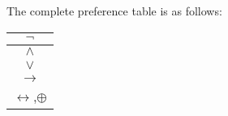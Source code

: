 \documentclass[letterpaper,12pt,fleqn]{article}
\renewcommand{\implies}{\rightarrow}
\renewcommand{\iff}{\leftrightarrow}
\newcommand{\lxor}{\oplus}
\begin{document}
The complete preference table is as follows:

\begin{center}
  \begin{tabular}{|c|}
    \hline
    \(\lnot\) \\
    \hline
    \(\land\) \\
    \hline
    \(\lor\) \\
    \hline
    \(\implies\) \\
    \hline
    \(\iff\),\(\lxor\) \\
    \hline
  \end{tabular}
\end{center}
\end{document}
